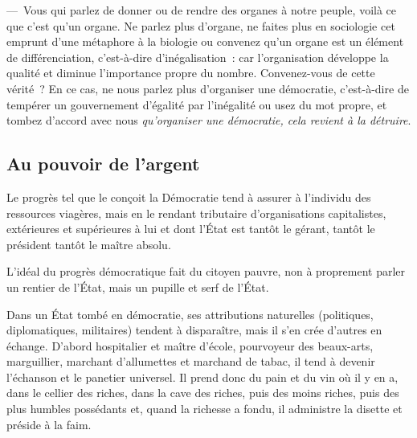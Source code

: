 \documentclass[french,twoside]{book} %
\newcommand{\astermono}{\medskip\centerline{\color{rubric}\large\selectfont{\syms ✻}}\medskip\par}%
\begin{document}
— Vous qui parlez de donner ou de rendre des organes à notre peuple, voilà ce que c’est qu’un organe. Ne parlez plus d’organe, ne faites plus en sociologie cet emprunt d’une métaphore à la biologie ou convenez qu’un organe est un élément de différenciation, c’est-à-dire d’inégalisation : car l’organisation développe la qualité et diminue l’importance propre du nombre. Convenez-vous de cette vérité ? En ce cas, ne nous parlez plus d’organiser une démocratie, c’est-à-dire de tempérer un gouvernement d’égalité par l’inégalité ou usez du mot propre, et tombez d’accord avec nous \emph{qu’organiser une démocratie, cela revient à la détruire}.\par
\subsection[{Au pouvoir de l’argent}]{Au pouvoir de l’argent}
\noindent Le progrès tel que le conçoit la Démocratie tend à assurer à l’individu des ressources viagères, mais en le rendant tributaire d’organisations capitalistes, extérieures et supérieures à lui et dont l’État est tantôt le gérant, tantôt le président tantôt le maître absolu.\par
L’idéal du progrès démocratique fait du citoyen pauvre, non à proprement parler un rentier de l’État, mais un pupille et serf de l’État.\par

\astermono

\noindent Dans un État tombé en démocratie, ses attributions naturelles (politiques, diplomatiques, militaires) tendent à disparaître, mais il s’en crée d’autres en échange. D’abord hospitalier et maître d’école, pourvoyeur des beaux-arts, marguillier, marchant d’allumettes et marchand de tabac, il tend à devenir l’échanson et le panetier universel. Il prend donc du pain et du vin où il y en a, dans le cellier des riches, dans la cave des riches, puis des moins riches, puis des plus humbles possédants et, quand la richesse a fondu, il administre la disette et préside à la faim.\par

\astermono
\end{document}
